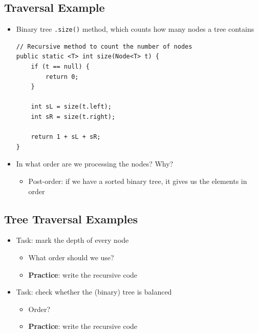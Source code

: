 \documentclass[10pt]{article}
\begin{document}
\subsection*{Traversal Example}
\begin{itemize}
    \item Binary tree \texttt{.size()} method, which counts how many nodes a tree contains
\begin{verbatim}
// Recursive method to count the number of nodes
public static <T> int size(Node<T> t) {
    if (t == null) {
        return 0;
    }

    int sL = size(t.left);
    int sR = size(t.right);

    return 1 + sL + sR;
}
\end{verbatim}
    \item In what order are we processing the nodes? Why?
    \begin{itemize}
        \item Post-order: if we have a sorted binary tree, it gives us the elements in order
    \end{itemize}
\end{itemize}

\subsection*{Tree Traversal Examples}
\begin{itemize}
    \item Task: mark the depth of every node
    \begin{itemize}
        \item What order should we use?
        \item \textbf{Practice}: write the recursive code
    \end{itemize}
    \item Task: check whether the (binary) tree is balanced
    \begin{itemize}
        \item Order?
        \item \textbf{Practice}: write the recursive code
    \end{itemize}
\end{itemize}
\end{document}
